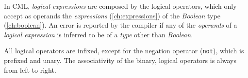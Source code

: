 In CML, \emph{logical expressions} are composed by the logical operators,
which only accept as operands the \emph{expressions} (\ref{ch:expressions})
of the \emph{Boolean} type (\ref{ch:boolean}).
An error is reported by the compiler if any of the \emph{operands}
of a \emph{logical expression} is inferred to be of a \emph{type}
other than \emph{Boolean}.

All logical operators are infixed,
except for the negation operator (\verb|not|),
which is prefixed and unary.
The associativity of the binary, logical operators is always from left to right.
